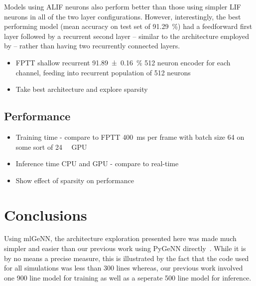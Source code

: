 \documentclass[sigconf]{acmart}
\begin{document}
Models using ALIF neurons also perform better than those using simpler LIF neurons in all of the two layer configurations.
However, interestingly, the best performing model (mean accuracy on test set of \SI{91.29}{\percent}) had a feedforward first layer followed by a recurrent second layer  -- similar to the architecture employed by \citet{yin2021accurate} -- rather than having two recurrently connected layers.
\begin{itemize}
    \item FPTT shallow recurrent \SI{91.89 \pm 0.16}{\percent} 512 neuron encoder for each channel, feeding into recurrent population of 512 neurons
    \item Take best architecture and explore sparsity
\end{itemize}

\subsection{Performance}
\begin{itemize}
    \item Training time - compare to FPTT \SI{400}{\milli\second} per frame with batch size 64 on some sort of \SI{24}{\giga\byte} GPU
    \item Inference time CPU and GPU - compare to real-time
    \item Show effect of sparsity on performance
\end{itemize}

\section{Conclusions}
Using mlGeNN, the architecture exploration presented here was made much simpler and easier than our previous work using PyGeNN directly~\citep{Knight2022}.
While it is by no means a precise measure, this is illustrated by the fact that the code used for all simulations was less than \num{300} lines whereas, our previous work involved one \num{900} line model for training as well as a seperate \num{500} line model for inference.
\end{document}
